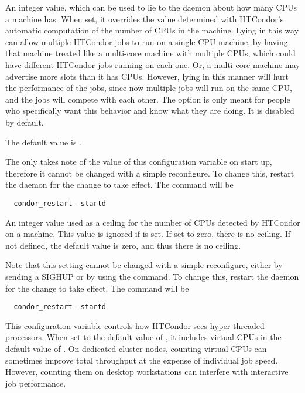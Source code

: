 \begin{description}
\label{param:NumCpus}
\item[\Macro{NUM\_CPUS}]
  An integer value, which can be used to lie to the  daemon
  about how many CPUs a machine has.
  When set, it overrides the value determined with HTCondor's 
  automatic computation of the number of CPUs in the machine.
  Lying in this way can allow multiple HTCondor jobs to run on a
  single-CPU machine, by having that machine treated like a multi-core 
  machine with multiple CPUs, which could have different HTCondor jobs
  running on each one.
  Or, a multi-core machine may advertise more slots than it has CPUs.
  However, lying in this manner will hurt the performance of the jobs,
  since now multiple jobs will run on the same CPU,
  and the jobs will compete with each other.
  The option is only meant for people who specifically want this
  behavior and know what they are doing.  
  It is disabled by default.

  The default value is .

  The  only takes note of the value of this configuration
  variable on start up,
  therefore it cannot be changed with a simple reconfigure. 
  To change this, restart the  daemon for the
  change to take effect. The command will be
\begin{verbatim}
  condor_restart -startd
\end{verbatim}

\label{param:MaxNumCpus}
\item[\Macro{MAX\_NUM\_CPUS}]
  An integer value used as a ceiling for the number of CPUs detected
  by HTCondor on a machine.
  This value is ignored if  is set.
  If set to zero, there is no ceiling. 
  If not defined, the default value is zero, and thus there is no ceiling. 

  Note that this setting cannot be changed with a simple reconfigure, 
  either by sending a SIGHUP or by using the  command.
  To change this, restart the  daemon for the
  change to take effect. The command will be
\begin{verbatim}
  condor_restart -startd
\end{verbatim}

\label{param:CountHyperthreadCpus}
\item[\Macro{COUNT\_HYPERTHREAD\_CPUS}]
  This configuration variable controls how HTCondor sees hyper-threaded
  processors. When set to the default value of , 
  it includes virtual CPUs in
  the default value of . On dedicated cluster nodes, 
  counting virtual CPUs can sometimes improve total throughput at the expense 
  of individual job speed. However, counting them on desktop workstations can
  interfere with interactive job performance.


\end{description}
